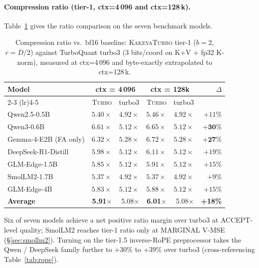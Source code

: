 \documentclass[11pt,a4paper]{article}
\theoremstyle{definition}
\theoremstyle{plain}
\begin{document}
\paragraph{Compression ratio (tier-1, ctx=4\,096 and ctx=128\,k).}
Table~\ref{tab:bench-ratio-vs-turbo3} gives the ratio comparison on the seven benchmark models.

\begin{table}[H]
\centering
\small
\caption{Compression ratio vs.\ bf16 baseline: \textsc{KakeyaTurbo} tier-1 ($b=2$, $r=D/2$) against TurboQuant turbo3 ($3$ bits/coord on K+V + fp32 K-norm), measured at ctx=4\,096 and byte-exactly extrapolated to ctx=128\,k.}
\label{tab:bench-ratio-vs-turbo3}
\begin{tabular}{lrrrrr}
  \toprule
  Model & \multicolumn{2}{c}{ctx = 4\,096} & \multicolumn{2}{c}{ctx = 128k} & $\Delta$ \\
  \cmidrule(lr){2-3} \cmidrule(lr){4-5}
  & \textsc{Turbo} & turbo3 & \textsc{Turbo} & turbo3 & \\
  \midrule
  Qwen2.5-0.5B          & $5.40\times$ & $4.92\times$ & $5.46\times$ & $4.92\times$ & $+11\%$ \\
  Qwen3-0.6B            & $\mathbf{6.61\times}$ & $5.12\times$ & $\mathbf{6.65\times}$ & $5.12\times$ & $\mathbf{+30\%}$ \\
  Gemma-4-E2B (FA only) & $\mathbf{6.32\times}$ & $5.28\times$ & $\mathbf{6.72\times}$ & $5.28\times$ & $\mathbf{+27\%}$ \\
  DeepSeek-R1-Distill   & $5.98\times$ & $5.12\times$ & $6.11\times$ & $5.12\times$ & $+19\%$ \\
  GLM-Edge-1.5B         & $5.85\times$ & $5.12\times$ & $5.91\times$ & $5.12\times$ & $+15\%$ \\
  SmolLM2-1.7B          & $5.37\times$ & $4.92\times$ & $5.37\times$ & $4.92\times$ & $+9\%$ \\
  GLM-Edge-4B           & $5.83\times$ & $5.12\times$ & $5.88\times$ & $5.12\times$ & $+15\%$ \\
  \midrule
  \textbf{Average}      & \textbf{5.91}$\times$ & 5.08$\times$ & \textbf{6.01}$\times$ & 5.08$\times$ & \textbf{+18\%} \\
  \bottomrule
\end{tabular}
\end{table}

Six of seven models achieve a net positive ratio margin over turbo3 at ACCEPT-level quality; SmolLM2 reaches tier-1 ratio only at MARGINAL V-MSE (\S\ref{sec:smollm2}). Turning on the tier-1.5 inverse-RoPE preprocessor takes the Qwen / DeepSeek family further to $+30\%$ to $+39\%$ over turbo3 (cross-referencing Table~\ref{tab:rope}).
\end{document}
